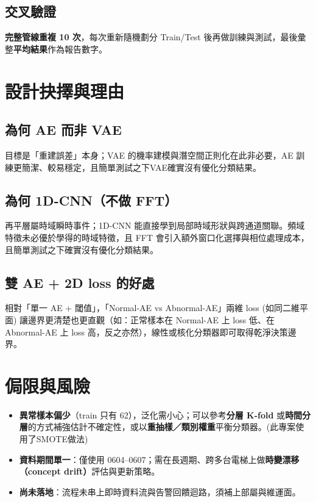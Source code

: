 \documentclass[12pt,a4paper]{article}
\begin{document}
\subsection{交叉驗證}

\textbf{完整管線重複 10 次}，每次重新隨機劃分 Train/Test 後再做訓練與測試，最後彙整\textbf{平均結果}作為報告數字。

\section{設計抉擇與理由}

\subsection{為何 AE 而非 VAE}

目標是「重建誤差」本身；VAE 的機率建模與潛空間正則化在此非必要，AE 訓練更簡潔、較易穩定，且簡單測試之下VAE確實沒有優化分類結果。

\subsection{為何 1D-CNN（不做 FFT）}

再平層屬時域瞬時事件；1D-CNN 能直接學到局部時域形狀與跨通道關聯。頻域特徵未必優於學得的時域特徵，且 FFT 會引入額外窗口化選擇與相位處理成本，且簡單測試之下確實沒有優化分類結果。

\subsection{雙 AE + 2D loss 的好處}

相對「單一 AE + 閾值」，「Normal-AE vs Abnormal-AE」兩維 loss (如同二維平面) 讓邊界更清楚也更直觀（如：正常樣本在 Normal-AE 上 loss 低、在 Abnormal-AE 上 loss 高，反之亦然），線性或核化分類器即可取得乾淨決策邊界。

\section{侷限與風險}

\begin{itemize}
    \item \textbf{異常樣本偏少}（train 只有 62），泛化需小心；可以參考\textbf{分層 K-fold} 或\textbf{時間分層}的方式補強估計不確定性，或以\textbf{重抽樣／類別權重}平衡分類器。(此專案使用了SMOTE做法)
    \item \textbf{資料期間單一}：僅使用 0604–0607；需在長週期、跨多台電梯上做\textbf{時變漂移（concept drift）}評估與更新策略。
    \item \textbf{尚未落地}：流程未串上即時資料流與告警回饋迴路，須補上部屬與維運面。
\end{itemize}
\end{document}
